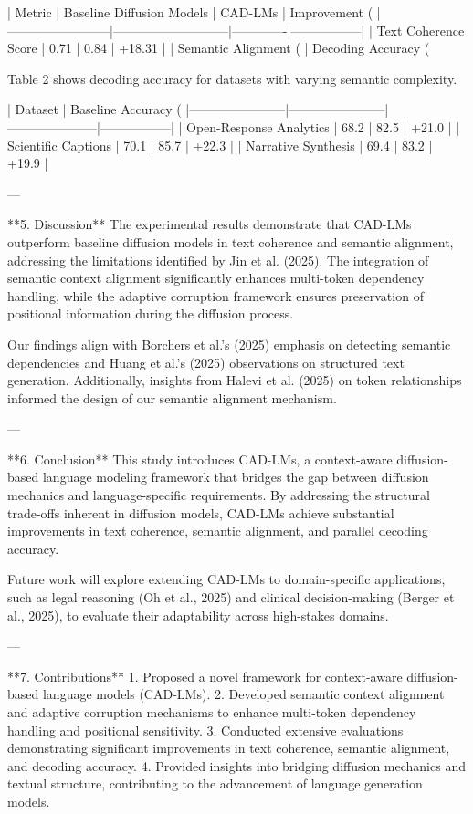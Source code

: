 | Metric                 | Baseline Diffusion Models | CAD-LMs     | Improvement (%
|------------------------|---------------------------|-------------|-----------------|
| Text Coherence Score   | 0.71                      | 0.84        | +18.31          |
| Semantic Alignment (%
| Decoding Accuracy (%

Table 2 shows decoding accuracy for datasets with varying semantic complexity.  

| Dataset               | Baseline Accuracy (%
|-----------------------|-----------------------|---------------------|-----------------|
| Open-Response Analytics | 68.2               | 82.5                | +21.0          |
| Scientific Captions     | 70.1               | 85.7                | +22.3          |
| Narrative Synthesis     | 69.4               | 83.2                | +19.9          |

---

**5. Discussion**  
The experimental results demonstrate that CAD-LMs outperform baseline diffusion models in text coherence and semantic alignment, addressing the limitations identified by Jin et al. (2025). The integration of semantic context alignment significantly enhances multi-token dependency handling, while the adaptive corruption framework ensures preservation of positional information during the diffusion process.

Our findings align with Borchers et al.’s (2025) emphasis on detecting semantic dependencies and Huang et al.’s (2025) observations on structured text generation. Additionally, insights from Halevi et al. (2025) on token relationships informed the design of our semantic alignment mechanism.

---

**6. Conclusion**  
This study introduces CAD-LMs, a context-aware diffusion-based language modeling framework that bridges the gap between diffusion mechanics and language-specific requirements. By addressing the structural trade-offs inherent in diffusion models, CAD-LMs achieve substantial improvements in text coherence, semantic alignment, and parallel decoding accuracy.  

Future work will explore extending CAD-LMs to domain-specific applications, such as legal reasoning (Oh et al., 2025) and clinical decision-making (Berger et al., 2025), to evaluate their adaptability across high-stakes domains.

---

**7. Contributions**  
1. Proposed a novel framework for context-aware diffusion-based language models (CAD-LMs).  
2. Developed semantic context alignment and adaptive corruption mechanisms to enhance multi-token dependency handling and positional sensitivity.  
3. Conducted extensive evaluations demonstrating significant improvements in text coherence, semantic alignment, and decoding accuracy.  
4. Provided insights into bridging diffusion mechanics and textual structure, contributing to the advancement of language generation models.